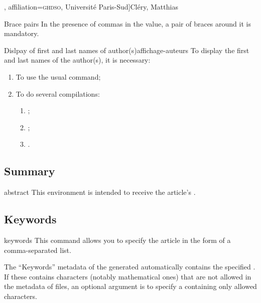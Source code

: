 \documentclass[english,nolocaltoc]{nwejmart}
\newtheorem[style=definition]{fact}
\newtheorem[title-plural=Criteria]{criterion}
\newtheorem[title=random experiment]{rexp}
\begin{document}
\begin{bodycode}
\author[
  affiliation={Laboratoire \textsc{sphere}, Universit\'e Paris Diderot}
  ]{Bustamante, Martha-Cecilia}
\author[
  affiliation=[aff2]{\textsc{lpma}, Universit\'e Pierre et Marie Curie},
  affiliation={\textsc{ghdso}, Universit\'e Paris-Sud}]{Cl\'ery, Matthias}
\author[
  affiliationtagged={aff2}
]{Mazliak, Laurent}
\end{bodycode}

\begin{dbwarning}{Brace pairs
    }{}
  In the presence of commas in the  value, a pair of braces
  around it is mandatory.
\end{dbwarning}

\begin{dbwarning}{Dislpay of first and last names of author(s)}{affichage-auteurs}
  To display the first and last names of the author(s), it is
  necessary:
  \begin{enumerate}
  \item To use the usual  command;
  \item To do several compilations\suitecompilations{}:
    \begin{enumerate}
    \item {} ;
    \item {} ;
    \item {}.
    \end{enumerate}
  \end{enumerate}
\end{dbwarning}

\subsection{Summary}
\label{sec-resume}

\begin{docEnvironment}[doc description=\mandatory,doclang/environment content=abstract]{abstract}{}
  This  environment is intended to receive the article's .
\end{docEnvironment}

\subsection{Keywords}

\begin{docCommand}[doc
  description=\mandatory]{keywords}{}
  This command allows you to specify the article   in
  the form of a comma-separated list.

  The \enquote{Keywords} metadata of the generated  automatically 
  contains the specified .  If these contains
  characters (notably mathematical ones) that are not allowed in the
  metadata of   files, an optional argument is to specify a
   containing only allowed characters.
\end{docCommand}
\end{document}
